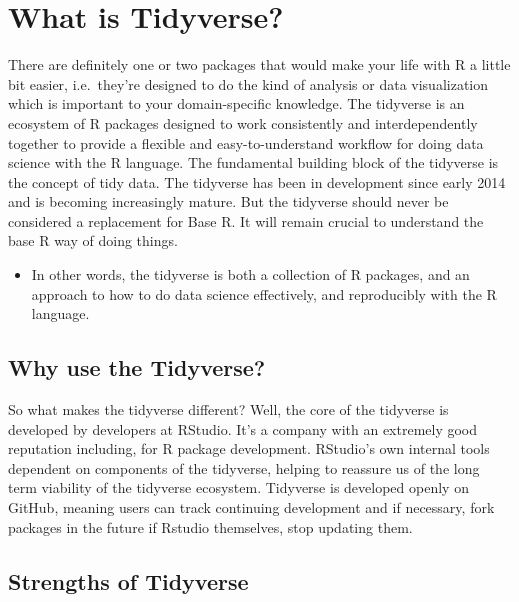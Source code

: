\documentclass[
]{article}
\providecommand{\tightlist}{%
  \setlength{\itemsep}{0pt}\setlength{\parskip}{0pt}}
\begin{document}
\hypertarget{what-is-tidyverse}{%
\section{What is Tidyverse?}\label{what-is-tidyverse}}

There are definitely one or two packages that would make your life with R a little bit easier, i.e.~they're designed to do the kind of analysis or data visualization which is important to your domain-specific knowledge. The tidyverse is an ecosystem of R packages designed to work consistently and interdependently together to provide a flexible and easy-to-understand workflow for doing data science with the R language. The fundamental building block of the tidyverse is the concept of tidy data. The tidyverse has been in development since early 2014 and is becoming increasingly mature. But the tidyverse should never be considered a replacement for Base R. It will remain crucial to understand the base R way of doing things.

\begin{itemize}
\tightlist
\item
  In other words, the tidyverse is both a collection of R packages, and an approach to how to do data science effectively, and reproducibly with the R language.
\end{itemize}

\hypertarget{why-use-the-tidyverse}{%
\subsection{Why use the Tidyverse?}\label{why-use-the-tidyverse}}

So what makes the tidyverse different? Well, the core of the tidyverse is developed by developers at RStudio. It's a company with an extremely good reputation including, for R package development. RStudio's own internal tools dependent on components of the tidyverse, helping to reassure us of the long term viability of the tidyverse ecosystem. Tidyverse is developed openly on GitHub, meaning users can track continuing development and if necessary, fork packages in the future if Rstudio themselves, stop updating them.

\hypertarget{strengths-of-tidyverse}{%
\subsection{Strengths of Tidyverse}\label{strengths-of-tidyverse}}
\end{document}
